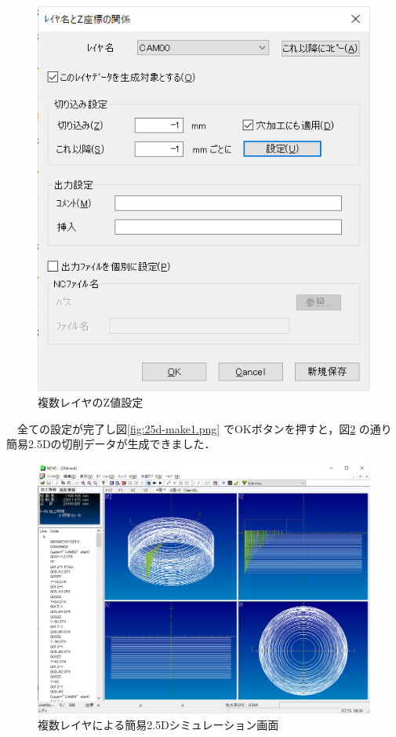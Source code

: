 \begin{minipage}{0.5\textwidth}
\begin{figure}[H]
\centering
\includegraphics[scale=0.7]{No3/fig/25d-make2.png}
\caption{複数レイヤのZ値設定}
\label{fig:25d-make2.png}
\end{figure}
\end{minipage}

\vspace*{2zh}
　全ての設定が完了し図\ref{fig:25d-make1.png} でOKボタンを押すと，図\ref{fig:25d.png} の通り簡易2.5Dの切削データが生成できました．

\begin{figure}[H]
\centering
\includegraphics[scale=0.55]{No3/fig/25d.png}
\caption{複数レイヤによる簡易2.5Dシミュレーション画面}
\label{fig:25d.png}
\end{figure}

